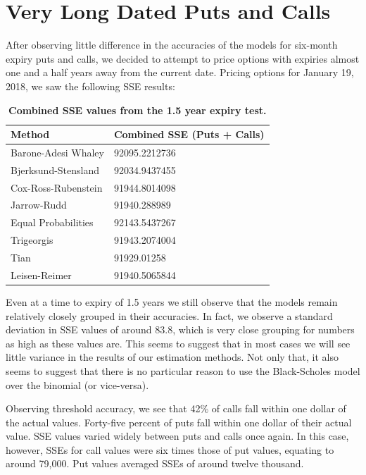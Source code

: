 \section{Very Long Dated Puts and Calls}

After observing little difference in the accuracies of the models for six-month expiry puts and calls, we decided to attempt to price options with expiries almost one and a half years away from the current date. Pricing options for January 19, 2018, we saw the following SSE results:

\begin{table}[h!]
\centering
\begin{tabu} to .8\textwidth { | X[c] | X[c] | }
 \hline
Method & Combined SSE (Puts + Calls)\\
 \hline
Barone-Adesi Whaley & 92095.2212736\\
Bjerksund-Stensland &  92034.9437455\\
Cox-Ross-Rubenstein & 91944.8014098\\
Jarrow-Rudd & 91940.288989 \\
 Equal Probabilities & 92143.5437267\\
Trigeorgis & 91943.2074004 \\
Tian & 91929.01258\\
Leisen-Reimer & 91940.5065844\\
\hline
\end{tabu}
\caption {\textbf{Combined SSE values from the 1.5 year expiry test.}}
\end{table}

Even at a time to expiry of 1.5 years we still observe that the models remain relatively closely grouped in their accuracies. In fact, we observe a standard deviation in SSE values of around 83.8, which is very close grouping for numbers as high as these values are. This seems to suggest that in most cases we will see little variance in the results of our estimation methods. Not only that, it also seems to suggest that there is no particular reason to use the Black-Scholes model over the binomial (or vice-versa). 

Observing threshold accuracy, we see that 42\% of calls fall within one dollar of the actual values. Forty-five percent of puts fall within one dollar of their actual value. SSE values varied widely between puts and calls once again. In this case, however, SSEs for call values were six times those of put values, equating to around 79,000. Put values averaged SSEs of around twelve thousand. 

